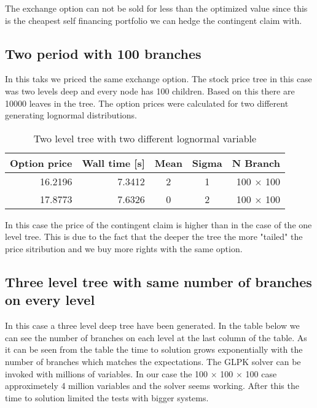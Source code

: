 \documentclass[11pt]{article}
\begin{document}
The exchange option can not be sold for less than the optimized value since this is the cheapest self financing portfolio we can hedge the contingent claim with.  

\subsection{Two period with 100 branches}
In this taks we priced the same exchange option. The stock price tree in this case was two levels deep and every node has 100 children. Based on this there are 10000 leaves in the tree. The option prices were calculated for two different generating lognormal distributions. 

\begin{table}[h!]
  \begin{center}
    \begin{tabular}{rrccr}
      \textbf{Option price} & \textbf{Wall time [s]} & \textbf{Mean} & \textbf{Sigma} & \textbf{N Branch} \\
      \hline
      16.2196   & 7.3412           & 2    &     1 & 100 $\times$ 100 \\
      17.8773   & 7.6326           & 0    &     2 & 100 $\times$ 100 \\
     \end{tabular}
    \caption{Two level tree with two different lognormal variable}
  \end{center}
\end{table}

In this case the price of the contingent claim is higher than in the case of the one level tree. This is due to the fact that the deeper the tree the more "tailed" the price sitribution and we buy more rights with the same option.

\subsection{Three level tree with same number of branches on every level}
In this case a three level deep tree have been generated. In the table below we can see the number of branches on each level at the last column of the table. As it can be seen from the table the time to solution grows exponentially with the number of branches which matches the expectations. The GLPK solver can be invoked with millions of variables. In our case the 100 $\times$ 100 $\times$ 100 case approximetely 4 million variables and the solver seems working. After this the time to solution limited the tests with bigger systems.
\end{document}
